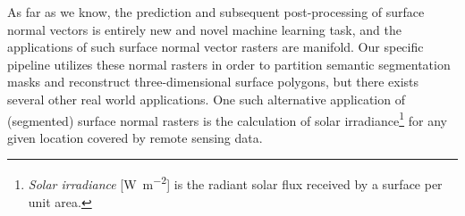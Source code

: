 As far as we know, the prediction and subsequent post-processing of surface normal vectors is entirely new and novel machine learning task, and the applications of such surface normal vector rasters are manifold.
Our specific pipeline utilizes these normal rasters in order to partition semantic segmentation masks and reconstruct three-dimensional surface polygons, but there exists several other real world applications.
One such alternative application of (segmented) surface normal rasters is the calculation of solar irradiance\footnote{\textit{Solar irradiance} [\si{\watt\per\meter\squared}] is the radiant solar flux received by a surface per unit area.} for any given location covered by remote sensing data.
